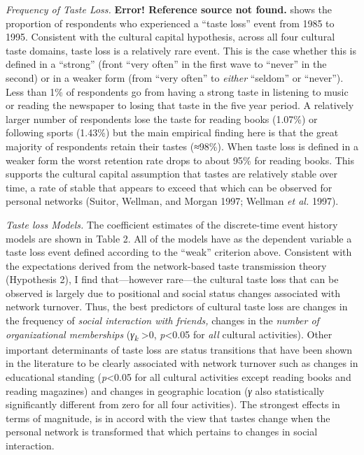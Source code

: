 \emph{Frequency of Taste Loss.} \textbf{Error! Reference source not found.} shows the proportion of respondents who experienced a ``taste loss'' event from 1985 to 1995. Consistent with the cultural capital hypothesis, across all four cultural taste domains, taste loss is a relatively rare event. This is the case whether this is defined in a ``strong'' (front ``very often'' in the first wave to ``never'' in the second) or in a weaker form (from ``very often'' to \emph{either} ``seldom'' or ``never''). Less than 1\% of respondents go from having a strong taste in listening to music or reading the newspaper to losing that taste in the five year period. A relatively larger number of respondents lose the taste for reading books (1.07\%) or following sports (1.43\%) but the main empirical finding here is that the great majority of respondents retain their tastes (≈98\%). When taste loss is defined in a weaker form the worst retention rate drops to about 95\% for reading books. This supports the cultural capital assumption that tastes are relatively stable over time, a rate of stable that appears to exceed that which can be observed for personal networks (Suitor, Wellman, and Morgan 1997; Wellman \emph{et al.} 1997).

\emph{Taste loss Models.} The coefficient estimates of the discrete-time event history models are shown in Table 2. All of the models have as the dependent variable a taste loss event defined according to the ``weak'' criterion above. Consistent with the expectations derived from the network-based taste transmission theory (Hypothesis 2), I find that---however rare---the cultural taste loss that can be observed is largely due to positional and social status changes associated with network turnover. Thus, the best predictors of cultural taste loss are changes in the frequency of \emph{social interaction with friends,} changes in the \emph{number of organizational memberships} (\emph{γ\textsubscript{k }}\textgreater0, \emph{p}\textless0.05 for \emph{all} cultural activities). Other important determinants of taste loss are status transitions that have been shown in the literature to be clearly associated with network turnover such as changes in educational standing (\emph{p}\textless0.05 for all cultural activities except reading books and reading magazines) and changes in geographic location (\emph{γ} also statistically significantly different from zero for all four activities). The strongest effects in terms of magnitude, is in accord with the view that tastes change when the personal network is transformed that which pertains to changes in social interaction.

